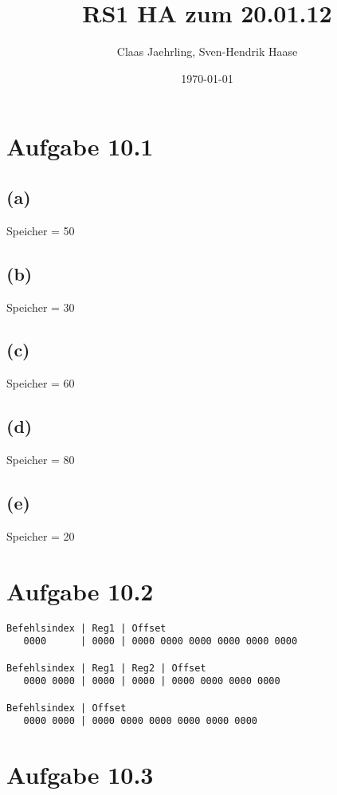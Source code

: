 \documentclass[12pt]{article}
\author{Claas Jaehrling, Sven-Hendrik Haase}
\title{RS1 HA zum 20.01.12}
\date{\today}
\begin{document}
\setcounter{secnumdepth}{0}
\maketitle

\section{Aufgabe 10.1}
\subsection{(a)}
Speicher = 50

\subsection{(b)}
Speicher = 30

\subsection{(c)}
Speicher = 60

\subsection{(d)}
Speicher = 80

\subsection{(e)}
Speicher = 20

\section{Aufgabe 10.2}
\begin{verbatim}
Befehlsindex | Reg1 | Offset
   0000      | 0000 | 0000 0000 0000 0000 0000 0000
 
Befehlsindex | Reg1 | Reg2 | Offset
   0000 0000 | 0000 | 0000 | 0000 0000 0000 0000

Befehlsindex | Offset
   0000 0000 | 0000 0000 0000 0000 0000 0000
\end{verbatim}

\section{Aufgabe 10.3}
\end{document}
